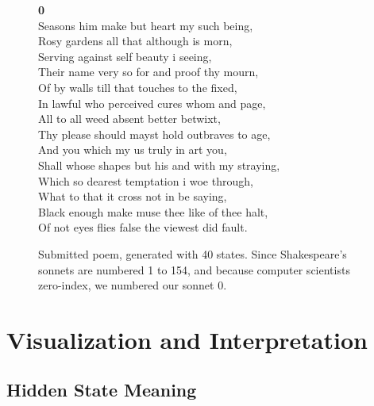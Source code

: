 \begin{figure}[h!]
	\begin{center}
{\bf 0}\\
\noindent Seasons him make but heart my such being,\\
Rosy gardens all that although is morn,\\
Serving against self beauty i seeing,\\
Their name very so for and proof thy mourn,\\
Of by walls till that touches to the fixed,\\
In lawful who perceived cures whom and page,\\
All to all weed absent better betwixt,\\
Thy please should mayst hold outbraves to age,\\
And you which my us truly in art you,\\
Shall whose shapes but his and with my straying,\\
Which so dearest temptation i woe through,\\
What to that it cross not in be saying,\\
Black enough make muse thee like of thee halt,\\
Of not eyes flies false the viewest did fault.
	\end{center}
	\caption{
		Submitted poem, generated with 40 states.  Since Shakespeare's sonnets are numbered 1 to 154, and because computer scientists zero-index, we numbered our sonnet 0.  
	}
\end{figure}

\section{Visualization and Interpretation}
\subsection{Hidden State Meaning}

